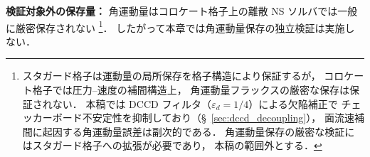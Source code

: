 \noindent\textbf{検証対象外の保存量：}
角運動量はコロケート格子上の離散 NS ソルバでは一般に厳密保存されない%
\footnote{スタガード格子は運動量の局所保存を格子構造により保証するが，
コロケート格子では圧力--速度の補間構造上，
角運動量フラックスの厳密な保存は保証されない．
本稿では DCCD フィルタ（$\varepsilon_d = 1/4$）による欠陥補正で
チェッカーボード不安定性を抑制しており（§~\ref{sec:dccd_decoupling}），
面流速補間に起因する角運動量誤差は副次的である．
角運動量保存の厳密な検証にはスタガード格子への拡張が必要であり，
本稿の範囲外とする．}．
したがって本章では角運動量保存の独立検証は実施しない．

